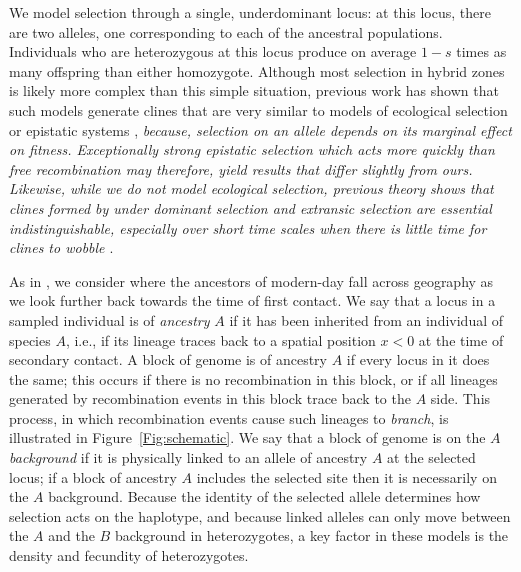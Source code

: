 \documentclass[11pt,letterpaper]{article}
\newcommand{\yb}[1]{{\em \color{magenta} #1}}
\begin{document}
We model selection through a single, underdominant locus:
at this locus, there are two alleles, one corresponding to each of the ancestral populations.
Individuals who are heterozygous at this locus produce on average $1-s$ times as many offspring than either homozygote.
Although most selection in hybrid zones is likely more complex than this simple situation, 
previous work has shown that such models generate clines that are very similar to models of ecological selection or epistatic systems \citep{Kruuk1999,barton2000epistasis}, \yb{because, selection on an allele depends on its marginal effect on fitness.  
Exceptionally strong epistatic selection which acts more quickly than free recombination may therefore, yield results that differ slightly from ours. 
Likewise, while we do not model ecological selection, previous theory shows that clines formed by under dominant selection and extransic selection are essential indistinguishable, especially over short time scales when there is little time for clines to wobble  \citep{Barton1979a}}.

As in \citet{sedghifar2015spatial}, we consider where the ancestors of modern-day 
fall across geography as we look further back towards the time of first contact.  
We say that a locus in a sampled individual is of \emph{ancestry} $A$ if it has been inherited from an individual of species $A$,
i.e., if its lineage traces back to a spatial position $x<0$  at the time of secondary contact.
A block of genome is of ancestry $A$ if every locus in it does the same; 
	this occurs if there is no recombination in this block, or if all lineages generated by recombination events 
	in this block trace back to the $A$ side. 
This process, in which recombination events cause such lineages to \emph{branch},
is illustrated in Figure~\ref{Fig:schematic}.
We say that a block of genome is on the $A$ \emph{background} if it is physically linked to an allele of ancestry $A$ at the selected locus;
if a block of ancestry $A$ includes the selected site then it is necessarily on the $A$ background.
Because the identity of the selected allele determines how selection acts on the haplotype,
and because linked alleles can only move between the $A$ and the $B$ background in heterozygotes, 
a key factor in these models is the density and fecundity of heterozygotes.
\end{document}

